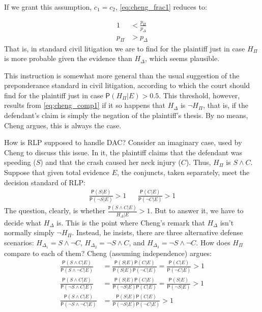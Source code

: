 \documentclass[10pt,dvipsnames,enabledeprecatedfontcommands]{scrartcl}
\newcommand{\n}{\neg}
\newcommand{\et}{\wedge}
\newcommand{\pr}[1]{\mathsf{P}(#1)}
\begin{document}
\noindent If we grant this assumption, \(c_1=c_2\),
\eqref{eq:cheng_frac1} reduces to:

\vspace{-6mm}

\begin{align}
\nonumber 1 &< \frac{p_\Pi}{p_\Delta} \\
\label{eq:cheng_comp1} p_\Pi &> p_\Delta 
\end{align} \noindent That is, in standard civil litigation we are to
find for the plaintiff just in case \(H_\Pi\) is more probable given the
evidence than \(H_\Delta\), which seems plausible.

This instruction is somewhat more general than the usual suggestion of
the preponderance standard in civil litigation, according to which the
court should find for the plaintiff just in case
\(\pr{H_\Pi\vert E} >0.5\). This threshold, however, results from
\eqref{eq:cheng_comp1} if it so happens that \(H_\Delta\) is
\(\n H_\Pi\), that is, if the defendant's claim is simply the negation
of the plaintiff's thesis. By no means, Cheng argues, this is always the
case.

How is RLP supposed to handle DAC? Consider an imaginary case, used by
Cheng to discuss this issue. In it, the plaintiff claims that the
defendant was speeding (\(S\)) and that the crash caused her neck injury
(\(C\)). Thus, \(H_\Pi\) is \(S\et C\). Suppose that given total
evidence \(E\), the conjuncts, taken separately, meet the decision
standard of RLP: \begin{align}
 \nonumber 
 \frac{\pr{S\vert E}}{\pr{\n S \vert E}} > 1   & & \frac{\pr{C\vert E}}{\pr{\n C \vert E}} > 1
\end{align} \noindent The question, clearly, is whether
\(\frac{\mathtt{P}(S\et C\vert E)}{H_\Delta \vert E}>1\). But to answer
it, we have to decide what \(H_\Delta\) is. This is the point where
Cheng's remark that \(H_\Delta\) isn't normally simply \(\n H_\Pi\).
Instead, he insists, there are three alternative defense scenarios:
\(H_{\Delta_1}= S\et \n C\), \(H_{\Delta_2}=\n S \et C\), and
\(H_{\Delta_3}=\n S \et \n C\). How does \(H_\Pi\) compare to each of
them? Cheng (assuming independence) argues:
\begin{align}\label{eq:cheng-multiplication}
\frac{\pr{S\et C\vert E}}{\pr{S\et \n C\vert E}} & = \frac{\pr{S\vert E}\pr{C\vert E}}{\pr{S \vert E}\pr{\n C \vert E}}  =\frac{\pr{C\vert E}}{\pr{\n C \vert E}} > 1 \\
\nonumber
\frac{\pr{S\et C\vert E}}{\pr{\n S\et C\vert E}} & = \frac{\pr{S\vert E}\pr{C\vert E}}{\pr{\n S \vert E}\pr{C\vert E}}  = \frac{\pr{S\vert E}}{\pr{\n S \vert E}} > 1 \\
\nonumber
\frac{\pr{S\et C\vert E}}{\pr{\n S\et \n C\vert E}} & = \frac{\pr{S\vert E}\pr{C\vert E}}{\pr{\n S \vert E}\pr{\n C \vert E}}   > 1 
\end{align}
\end{document}
